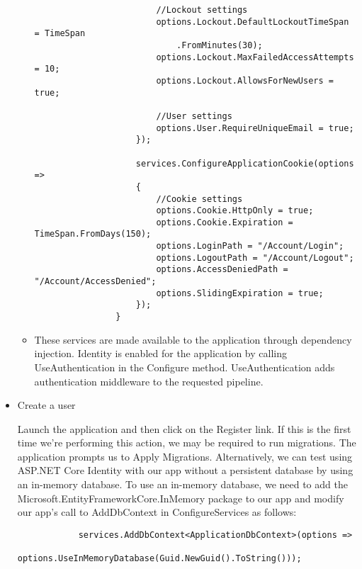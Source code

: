 \documentclass{report}
\begin{document}
\begin{itemize}
\begin{itemize}
\begin{lstlisting}
                        //Lockout settings
                        options.Lockout.DefaultLockoutTimeSpan = TimeSpan
                            .FromMinutes(30);
                        options.Lockout.MaxFailedAccessAttempts = 10;
                        options.Lockout.AllowsForNewUsers = true;

                        //User settings
                        options.User.RequireUniqueEmail = true;
                    });

                    services.ConfigureApplicationCookie(options =>
                    {
                        //Cookie settings
                        options.Cookie.HttpOnly = true;
                        options.Cookie.Expiration = TimeSpan.FromDays(150);
                        options.LoginPath = "/Account/Login";
                        options.LogoutPath = "/Account/Logout";
                        options.AccessDeniedPath = "/Account/AccessDenied";
                        options.SlidingExpiration = true;
                    });
                }
            \end{lstlisting}
            \item These services are made available to the application through
            dependency injection.
            Identity is enabled for the application by calling UseAuthentication in
            the Configure method. UseAuthentication adds authentication middleware
            to the requested pipeline.
        \end{itemize}
        \item Create a user

        Launch the application and then click on the Register link. If this is the
        first time we're performing this action, we may be required to run migrations.
        The application prompts us to Apply Migrations. Alternatively, we can test using
        ASP.NET Core Identity with our app without a persistent database by using an
        in-memory database. To use an in-memory database, we need to add the
        Microsoft.EntityFrameworkCore.InMemory package to our app and modify our app's
        call to AddDbContext in ConfigureServices as follows:
        \lstset{style=sharpc}
        \begin{lstlisting}
            services.AddDbContext<ApplicationDbContext>(options =>
                options.UseInMemoryDatabase(Guid.NewGuid().ToString()));
        \end{lstlisting}
    \end{itemize}
\end{document}
